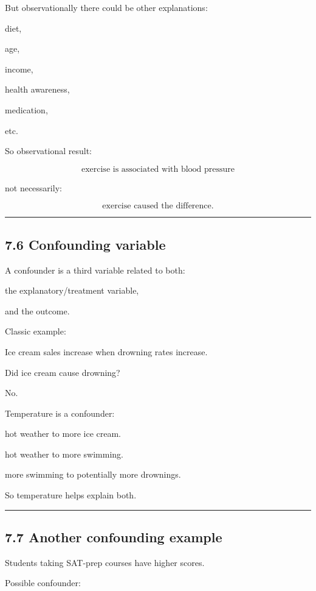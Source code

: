 \documentclass[
]{article}
\begin{document}
But observationally there could be other explanations:

diet,

age,

income,

health awareness,

medication,

etc.

So observational result:

\[
\boxed{\text{exercise is associated with blood pressure}}
\]

not necessarily:

\[
\boxed{\text{exercise caused the difference}}.
\]

\begin{center}\rule{0.5\linewidth}{0.5pt}\end{center}

\subsection{7.6 Confounding variable}\label{confounding-variable}

A confounder is a third variable related to both:

the explanatory/treatment variable,

and the outcome.

Classic example:

Ice cream sales increase when drowning rates increase.

Did ice cream cause drowning?

No.

Temperature is a confounder:

hot weather to more ice cream.

hot weather to more swimming.

more swimming to potentially more drownings.

So temperature helps explain both.

\begin{center}\rule{0.5\linewidth}{0.5pt}\end{center}

\subsection{7.7 Another confounding
example}\label{another-confounding-example}

Students taking SAT-prep courses have higher scores.

Possible confounder:
\end{document}
